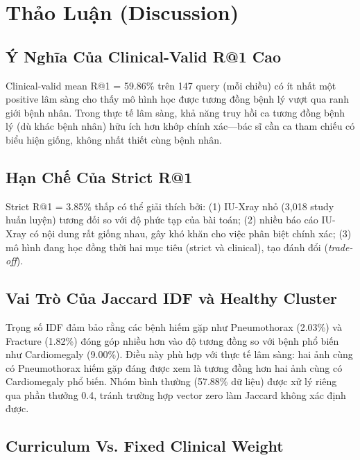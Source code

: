\documentclass[12pt, a4paper]{article}
\begin{document}
\section{Thảo Luận (Discussion)}
\label{sec:discussion}

\subsection{Ý Nghĩa Của Clinical-Valid R@1 Cao}

Clinical-valid mean R@1 = 59.86\% trên 147 query (mỗi chiều) có ít nhất một
positive lâm sàng cho thấy mô hình học được tương đồng bệnh lý vượt qua ranh
giới bệnh nhân. Trong thực tế lâm sàng, khả năng truy hồi ca tương đồng bệnh
lý (dù khác bệnh nhân) hữu ích hơn khớp chính xác---bác sĩ cần ca tham chiếu
có biểu hiện giống, không nhất thiết cùng bệnh nhân.

\subsection{Hạn Chế Của Strict R@1}

Strict R@1 = 3.85\% thấp có thể giải thích bởi: (1) IU-Xray nhỏ (3,018 study
huấn luyện) tương đối so với độ phức tạp của bài toán;
(2) nhiều báo cáo IU-Xray có nội dung rất giống nhau, gây khó khăn cho việc
phân biệt chính xác; (3) mô hình đang học đồng thời hai mục tiêu (strict và
clinical), tạo đánh đổi (\textit{trade-off}).

\subsection{Vai Trò Của Jaccard IDF và Healthy Cluster}

Trọng số IDF đảm bảo rằng các bệnh hiếm gặp như Pneumothorax (2.03\%) và
Fracture (1.82\%) đóng góp nhiều hơn vào độ tương đồng so với bệnh phổ biến
như Cardiomegaly (9.00\%). Điều này phù hợp với thực tế lâm sàng: hai ảnh
cùng có Pneumothorax hiếm gặp đáng được xem là tương đồng hơn hai ảnh cùng
có Cardiomegaly phổ biến. Nhóm bình thường (57.88\% dữ liệu) được xử lý
riêng qua phần thưởng 0.4, tránh trường hợp vector zero làm Jaccard không
xác định được.

\subsection{Curriculum Vs. Fixed Clinical Weight}
\end{document}

